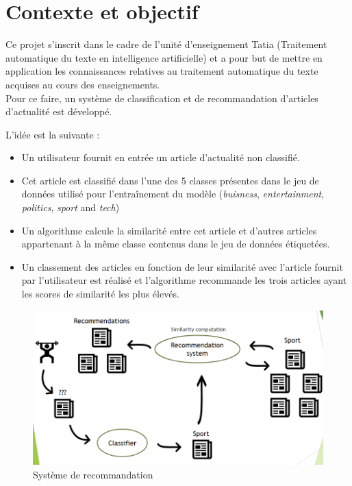\documentclass[a4paper,12pt]{article}
\begin{document}
\newpage

\section{Contexte et objectif}


Ce projet s'inscrit dans le cadre de l'unité d'enseignement Tatia (Traitement automatique du texte en intelligence artificielle) et a pour but de mettre en application les connaissances relatives au traitement automatique du texte acquises au cours des enseignements.\\

Pour ce faire, un système de classification et de recommandation d'articles d'actualité est développé.

L'idée est la suivante : 
\begin{itemize}
    \item Un utilisateur fournit en entrée un article d'actualité non classifié.
    \item Cet article est classifié dans l'une des 5 classes présentes dans le jeu de données utilisé pour l'entraînement du modèle (\textit{buisness}, \textit{entertainment}, \textit{politics}, \textit{sport} and \textit{tech})
    \item Un algorithme calcule la similarité entre cet article et d'autres articles appartenant à la même classe contenus dans le jeu de données étiquetées.
    \item Un classement des articles en fonction de leur similarité avec l'article fournit par l'utilisateur est réalisé et l'algorithme recommande les trois articles ayant les scores de similarité les plus élevés.
\end{itemize}

\begin{figure}[h]
  \centering
  \includegraphics{./images/recommendation_system.png}
  \caption{Système de recommandation}
  \label{fig:recommendationSystem}
\end{figure}
\end{document}
